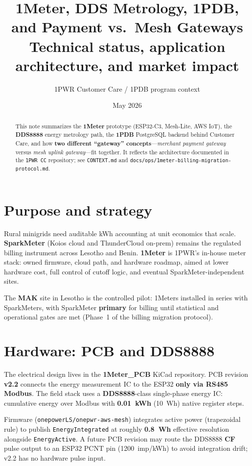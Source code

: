 \documentclass[11pt,a4paper]{article}
\title{\textbf{1Meter, DDS Metrology, 1PDB,\\and Payment vs.\ Mesh Gateways}\\
\large Technical status, application architecture, and market impact}
\author{1PWR Customer Care / 1PDB program context}
\date{May 2026}
\begin{document}
\maketitle
\thispagestyle{empty}

\begin{abstract}
\noindent
This note summarizes the \textbf{1Meter} prototype (ESP32-C3, Mesh-Lite, AWS IoT), the \textbf{DDS8888} energy metrology path, the \textbf{1PDB} PostgreSQL backend behind Customer Care, and how \textbf{two different ``gateway'' concepts}---\emph{merchant payment gateway} versus \emph{mesh uplink gateway}---fit together. It reflects the architecture documented in the \texttt{1PWR~CC} repository; see \texttt{CONTEXT.md} and \texttt{docs/ops/1meter-billing-migration-protocol.md}.
\end{abstract}

\section{Purpose and strategy}

Rural minigrids need auditable kWh accounting at unit economics that scale. \textbf{SparkMeter} (Koios cloud and ThunderCloud on-prem) remains the regulated billing instrument across Lesotho and Benin. \textbf{1Meter} is 1PWR's in-house meter stack: owned firmware, cloud path, and hardware roadmap, aimed at lower hardware cost, full control of cutoff logic, and eventual SparkMeter-independent sites.

The \textbf{MAK} site in Lesotho is the controlled pilot: 1Meters installed in series with SparkMeters, with SparkMeter \textbf{primary} for billing until statistical and operational gates are met (Phase~1 of the billing migration protocol).

\section{Hardware: PCB and DDS8888}

The electrical design lives in the \textbf{1Meter\_PCB} KiCad repository. PCB revision \textbf{v2.2} connects the energy measurement IC to the ESP32 \textbf{only via RS485 Modbus}. The field stack uses a \textbf{DDS8888}-class single-phase energy IC: cumulative energy over Modbus with \textbf{0.01~kWh} (10~Wh) native register steps.

Firmware (\texttt{onepowerLS/onepwr-aws-mesh}) integrates active power (trapezoidal rule) to publish \texttt{EnergyIntegrated} at roughly \textbf{0.8~Wh} effective resolution alongside \texttt{EnergyActive}. A future PCB revision may route the DDS8888 \textbf{CF} pulse output to an ESP32 PCNT pin (1200~imp/kWh) to avoid integration drift; v2.2 has no hardware pulse input.
\end{document}
